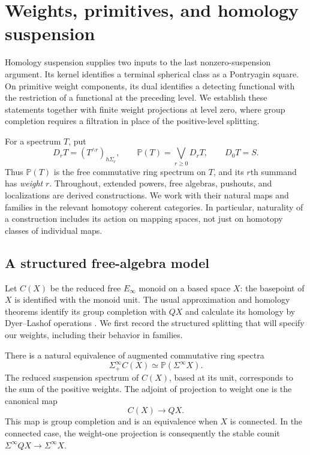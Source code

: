 \section{Weights, primitives, and homology suspension}
\label{sec:weights}

Homology suspension supplies two inputs to the last nonzero-suspension
argument. Its kernel identifies a terminal spherical class as a
Pontryagin square. On primitive weight components, its dual identifies
a detecting functional with the restriction of a functional at the
preceding level. We establish these statements together with finite
weight projections at level zero, where group completion requires a
filtration in place of the positive-level splitting.

For a spectrum $T$, put
\[
 D_rT=(T^{\wedge r})_{h\Sigma_r},\qquad
 \mathbb P(T)=\bigvee_{r\geq0}D_rT,\qquad D_0T=S.
\]
Thus $\mathbb P(T)$ is the free commutative ring spectrum on $T$, and its
$r$th summand has \emph{weight} $r$. Throughout, extended powers, free
algebras, pushouts, and localizations are derived constructions. We work
with their natural maps and families in the relevant homotopy coherent
categories. In particular, naturality of a construction includes its
action on mapping spaces, not just on homotopy classes of individual maps.

\subsection{A structured free-algebra model}

Let $C(X)$ be the reduced free $E_\infty$ monoid on a based space $X$:
the basepoint of $X$ is identified with the monoid unit. The usual
approximation and homology theorems identify its group completion with
$QX$ and calculate its homology by Dyer--Lashof operations
\cite[Part~I, Theorems~4.1--4.2 and Corollary~4.5]{CLM1976}.
We first record the structured splitting that will specify
our weights, including their behavior in families.

\begin{proposition}\label{prop:free-ring}
There is a natural equivalence of augmented commutative ring spectra
\[
 \Sigma^\infty_+ C(X)\simeq\mathbb P(\Sigma^\infty X).
\]
The reduced suspension spectrum of $C(X)$, based at its unit, corresponds
to the sum of the positive weights. The adjoint of projection to weight
one is the canonical map
\[
 C(X)\longrightarrow QX.
\]
This map is group completion and is an equivalence when $X$ is connected.
In the connected case, the weight-one projection is consequently the
stable counit
$\Sigma^\infty QX\to\Sigma^\infty X$.
\end{proposition}

